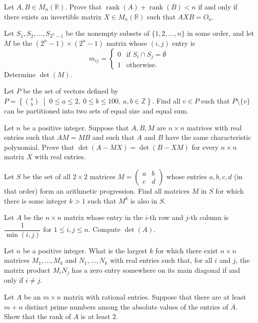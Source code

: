 \documentclass[12pt]{article}
\begin{document}
\begin{problems}
\item Let $A,B\in M_n(\mathbb{R})$. Prove that $\operatorname{rank}(A)+\operatorname{rank}(B) < n$ if and only if there exists an invertible matrix $X\in M_n(\mathbb{R})$ such that $AXB=O_n$.

\item Let $S_1,S_2,\dots,S_{2^n-1}$ be the nonempty subsets of $\{1,2,\dots,n\}$ in some order, and let $M$ be the $(2^n-1)\times(2^n-1)$ matrix whose $(i,j)$ entry is
\[
m_{ij} = \begin{cases} 0 & \text{if } S_i\cap S_j = \emptyset\\ 1 & \text{otherwise.}\end{cases}
\]
Determine $\det(M)$.

\item Let $P$ be the set of vectors defined by $P = \left\{\binom{a}{b} \;\middle|\; 0\le a\le 2,\ 0\le b\le 100,\ a,b\in\mathbb{Z}\right\}$. Find all $v\in P$ such that $P\setminus\{v\}$ can be partitioned into two sets of equal size and equal sum.

\item Let $n$ be a positive integer. Suppose that $A,B,M$ are $n\times n$ matrices with real entries such that $AM=MB$ and such that $A$ and $B$ have the same characteristic polynomial. Prove that $\det(A-MX) = \det(B-XM)$ for every $n\times n$ matrix $X$ with real entries.

\item Let $S$ be the set of all $2\times 2$ matrices $M = \begin{pmatrix}a & b\\ c & d\end{pmatrix}$ whose entries $a,b,c,d$ (in that order) form an arithmetic progression. Find all matrices $M$ in $S$ for which there is some integer $k>1$ such that $M^k$ is also in $S$.

\item Let $A$ be the $n\times n$ matrix whose entry in the $i$-th row and $j$-th column is $\dfrac{1}{\min(i,j)}$ for $1\le i,j\le n$. Compute $\det(A)$.

\item Let $n$ be a positive integer. What is the largest $k$ for which there exist $n\times n$ matrices $M_1,\dots,M_k$ and $N_1,\dots,N_k$ with real entries such that, for all $i$ and $j$, the matrix product $M_iN_j$ has a zero entry somewhere on its main diagonal if and only if $i\ne j$.

\item Let $A$ be an $m\times n$ matrix with rational entries. Suppose that there are at least $m+n$ distinct prime numbers among the absolute values of the entries of $A$. Show that the rank of $A$ is at least $2$.


\end{problems}
\end{document}
